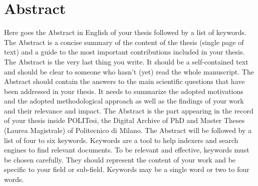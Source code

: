 \documentclass{Configuration_Files/PoliMi3i_thesis}
\begin{document}


\pagestyle{empty} %
\frontmatter %


\startpreamble
\setcounter{page}{1} %

\chapter*{Abstract} 
Here goes the Abstract in English of your thesis followed by a list of keywords.
The Abstract is a concise summary of the content of the thesis (single page of text)
and a guide to the most important contributions included in your thesis.
The Abstract is the very last thing you write.
It should be a self-contained text and should be clear to someone who hasn't (yet) read the whole manuscript.
The Abstract should contain the answers to the main scientific questions that have been addressed in your thesis.
It needs to summarize the adopted motivations and the adopted methodological approach as well as the findings of your work and their relevance and impact.
The Abstract is the part appearing in the record of your thesis inside POLITesi,
the Digital Archive of PhD and Master Theses (Laurea Magistrale) of Politecnico di Milano.
The Abstract will be followed by a list of four to six keywords.
Keywords are a tool to help indexers and search engines to find relevant documents.
To be relevant and effective, keywords must be chosen carefully.
They should represent the content of your work and be specific to your field or sub-field.
Keywords may be a single word or two to four words. 
\end{document}
